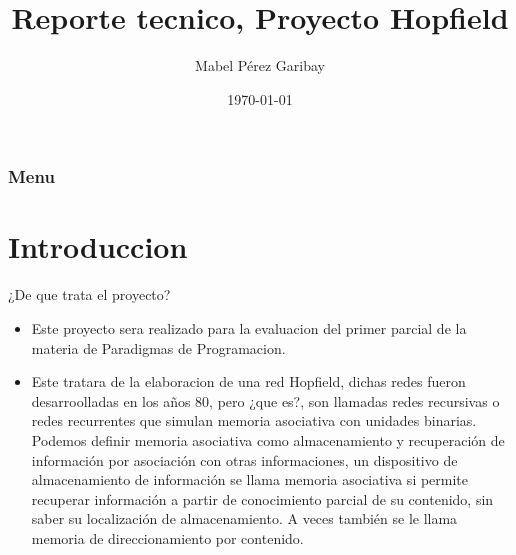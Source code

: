 \documentclass{beamer}
\title[Short title]{Reporte tecnico, Proyecto Hopfield} %
\author{Mabel Pérez Garibay} %
\institute[Universidad Veracruzana] %
{
Paradigmas de Programacion
\medskip
}
\date{\today} %
\begin{document}
\begin{frame}
\titlepage %
\end{frame}

\begin{frame}
\frametitle{Menu} %
\tableofcontents %
\end{frame}



\section{Introduccion}
\begin{frame}{¿De que trata el proyecto?}
    \begin{itemize}
        \item Este proyecto sera realizado para la evaluacion del primer parcial de la materia de Paradigmas de Programacion.
        \item Este tratara de la elaboracion de una red Hopfield, dichas redes fueron desarroolladas en los años 80, pero ¿que es?, son llamadas redes recursivas o redes recurrentes que simulan memoria asociativa con unidades binarias. Podemos definir memoria asociativa como almacenamiento y recuperación de información por asociación con otras informaciones, un dispositivo de almacenamiento de información se llama memoria asociativa si permite recuperar información a partir de conocimiento parcial de su contenido, sin saber su localización de almacenamiento. A veces también se le llama memoria de direccionamiento por contenido.
    \end{itemize}
\end{frame}
\end{document}
